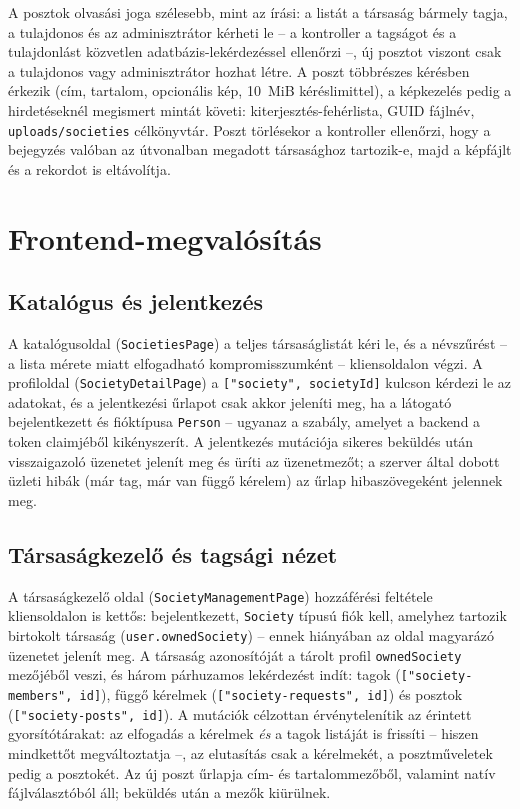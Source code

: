 A posztok olvasási joga szélesebb, mint az írási: a listát a társaság bármely tagja, a tulajdonos
és az adminisztrátor kérheti le -- a kontroller a tagságot és a tulajdonlást közvetlen
adatbázis-lekérdezéssel ellenőrzi --, új posztot viszont csak a tulajdonos vagy adminisztrátor
hozhat létre. A poszt többrészes kérésben érkezik (cím, tartalom, opcionális kép, 10~MiB
kéréslimittel), a képkezelés pedig a hirdetéseknél megismert mintát követi:
kiterjesztés-fehérlista, GUID fájlnév, \texttt{uploads/societies} célkönyvtár. Poszt törlésekor a
kontroller ellenőrzi, hogy a bejegyzés valóban az útvonalban megadott társasághoz tartozik-e,
majd a képfájlt és a rekordot is eltávolítja.

\section{Frontend-megvalósítás}
\label{sec:soc-frontend}

\subsection{Katalógus és jelentkezés}

A katalógusoldal (\texttt{SocietiesPage}) a teljes társaságlistát kéri le, és a névszűrést --
a lista mérete miatt elfogadható kompromisszumként -- kliensoldalon végzi. A profiloldal
(\texttt{SocietyDetailPage}) a \texttt{["society", societyId]} kulcson kérdezi le az adatokat, és
a jelentkezési űrlapot csak akkor jeleníti meg, ha a látogató bejelentkezett és fióktípusa
\texttt{Person} -- ugyanaz a szabály, amelyet a backend a token claimjéből kikényszerít. A
jelentkezés mutációja sikeres beküldés után visszaigazoló üzenetet jelenít meg és üríti az
üzenetmezőt; a szerver által dobott üzleti hibák (már tag, már van függő kérelem) az űrlap
hibaszövegeként jelennek meg.

\subsection{Társaságkezelő és tagsági nézet}

A társaságkezelő oldal (\texttt{SocietyManagementPage}) hozzáférési feltétele kliensoldalon is
kettős: bejelentkezett, \texttt{Society} típusú fiók kell, amelyhez tartozik birtokolt társaság
(\texttt{user.ownedSociety}) -- ennek hiányában az oldal magyarázó üzenetet jelenít meg. A
társaság azonosítóját a tárolt profil \texttt{ownedSociety} mezőjéből veszi, és három párhuzamos
lekérdezést indít: tagok (\texttt{["society-members", id]}), függő kérelmek
(\texttt{["society-requests", id]}) és posztok (\texttt{["society-posts", id]}). A mutációk
célzottan érvénytelenítik az érintett gyorsítótárakat: az elfogadás a kérelmek \emph{és} a tagok
listáját is frissíti -- hiszen mindkettőt megváltoztatja --, az elutasítás csak a kérelmekét, a
posztműveletek pedig a posztokét. Az új poszt űrlapja cím- és tartalommezőből, valamint natív
fájlválasztóból áll; beküldés után a mezők kiürülnek.

